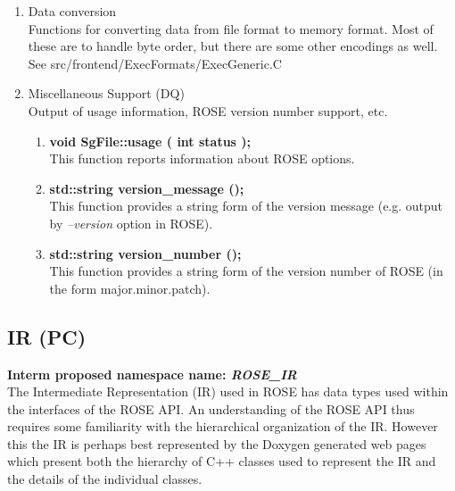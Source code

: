 \begin{enumerate}
   \item Data conversion \\
   Functions for converting data from file format to memory
   format. Most of these are to handle byte order, but there are
   some other encodings as well. \\
   See src/frontend/ExecFormats/ExecGeneric.C

   \item Miscellaneous Support (DQ) \\
         Output of usage information, ROSE version number support, etc.
   \begin{enumerate}
      \item {\bf void SgFile::usage ( int status );} \\
      This function reports information about ROSE options.
      \item {\bf std::string version\_message ();} \\
      This function provides a string form of the version message 
      (e.g. output by {\em --version} option in ROSE).
      \item {\bf std::string version\_number ();} \\
      This function provides a string form of the version number of ROSE
      (in the form major.minor.patch).
   \end{enumerate}

\end{enumerate}


\subsection{IR (PC)}
{\bf Interm proposed namespace name: {\em ROSE\_IR}} \\
   The Intermediate Representation (IR) used in ROSE has data types used
within the interfaces of the ROSE API.  An understanding of the ROSE API 
thus requires some familiarity with the hierarchical organization of the 
IR.  However this the IR is perhaps best represented by the Doxygen
generated web pages which present both the hierarchy of C++ classes 
used to represent the IR and the details of the individual classes.

\newpage


